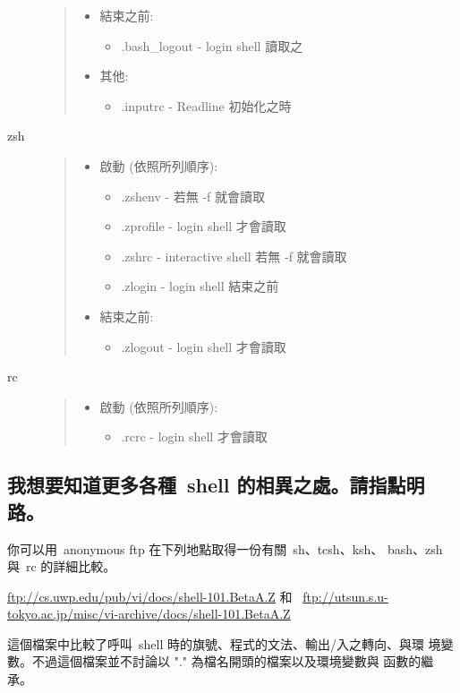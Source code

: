 \documentclass{article}
\begin{document}
\begin{CJK*}{Bg5}{ming}
\begin{description}
\begin{quote}
\begin{itemize}
         \item 結束之前:
	 \begin{itemize}
            \item  .bash\_logout  - login shell 讀取之
	 \end{itemize}
         \item 其他:
	 \begin{itemize}
            \item  .inputrc      - Readline 初始化之時
	 \end{itemize}
	\end{itemize}
\end{quote}
      \item[zsh]
\begin{quote}
	\begin{itemize}
          \item 啟動 (依照所列順序):
	\begin{itemize}
             \item  .zshenv - 若無 -f  就會讀取
             \item .zprofile - login shell 才會讀取
             \item  .zshrc    - interactive shell 若無 -f  就會讀取
             \item .zlogin   - login shell 結束之前
	\end{itemize}

          \item 結束之前:
	\begin{itemize}
             \item .zlogout  - login shell 才會讀取
	\end{itemize}
	\end{itemize}
\end{quote}
      \item[rc]
\begin{quote}
	\begin{itemize}
          \item 啟動 (依照所列順序):
	   \begin{itemize}
             \item .rcrc - login shell 才會讀取
	   \end{itemize}
	\end{itemize}
\end{quote}
\end{description}

\subsection{我想要知道更多各種~shell 的相異之處。請指點明路。}

	你可以用~anonymous ftp 在下列地點取得一份有關~sh、tcsh、ksh、
	bash、zsh 與~rc 的詳細比較。

      \url{ftp://cs.uwp.edu/pub/vi/docs/shell-101.BetaA.Z} 和~
      \url{ftp://utsun.s.u-tokyo.ac.jp/misc/vi-archive/docs/shell-101.BetaA.Z}

	這個檔案中比較了呼叫~shell 時的旗號、程式的文法、輸出/入之轉向、與環
	境變數。不過這個檔案並不討論以 "." 為檔名開頭的檔案以及環境變數與
	函數的繼承。
\end{CJK*}
\end{document}
